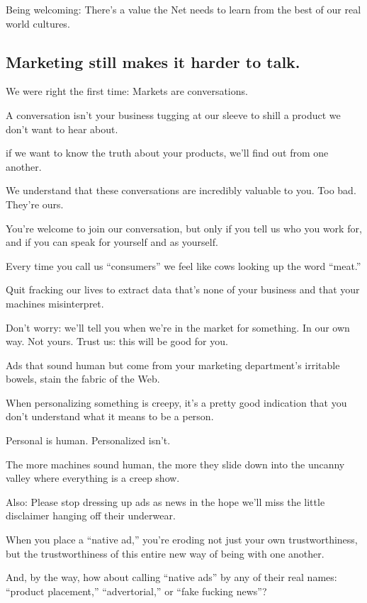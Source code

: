 \documentclass[letterpaper,12pt,english]{sphinxmanual}
\begin{document}
Being welcoming: There's a value the Net needs to learn from the best of our real world cultures.


\subsection{Marketing still makes it harder to talk.}
\label{2015newclues:marketing-still-makes-it-harder-to-talk}
We were right the first time: Markets are conversations.

A conversation isn't your business tugging at our sleeve to shill a product we don't want to hear about.

if we want to know the truth about your products, we'll find out from one another.

We understand that these conversations are incredibly valuable to you. Too bad. They're ours.

You're welcome to join our conversation, but only if you tell us who you work for, and if you can speak for yourself and as yourself.

Every time you call us ``consumers'' we feel like cows looking up the word ``meat.''

Quit fracking our lives to extract data that's none of your business and that your machines misinterpret.

Don't worry: we'll tell you when we're in the market for something. In our own way. Not yours. Trust us: this will be good for you.

Ads that sound human but come from your marketing department's irritable bowels, stain the fabric of the Web.

When personalizing something is creepy, it's a pretty good indication that you don't understand what it means to be a person.

Personal is human. Personalized isn't.

The more machines sound human, the more they slide down into the uncanny valley where everything is a creep show.

Also: Please stop dressing up ads as news in the hope we'll miss the little disclaimer hanging off their underwear.

When you place a ``native ad,'' you're eroding not just your own trustworthiness, but the trustworthiness of this entire new way of being with one another.

And, by the way, how about calling ``native ads'' by any of their real names: ``product placement,'' ``advertorial,'' or ``fake fucking news''?
\end{document}
